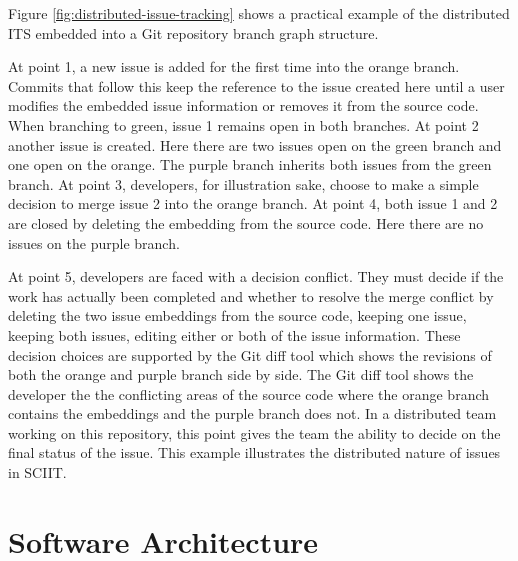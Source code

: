 \documentclass{mproj}
\begin{document}
Figure \ref{fig:distributed-issue-tracking} shows a practical example of the distributed ITS embedded into a Git repository branch graph structure. 

At point 1, a new issue is added for the first time into the orange branch. Commits that follow this keep the reference to the issue created here until a user modifies the embedded issue information or removes it from the source code. When branching to green, issue 1 remains open in both branches. At point 2 another issue is created. Here there are two issues open on the green branch and one open on the orange. The purple branch inherits both issues from the green branch. At point 3, developers, for illustration sake, choose to make a simple decision to merge issue 2 into the orange branch. At point 4, both issue 1 and 2 are closed by deleting the embedding from the source code. Here there are no issues on the purple branch. 

At point 5, developers are faced with a decision conflict. They must decide if the work has actually been completed and whether to resolve the merge conflict by deleting the two issue embeddings from the source code, keeping one issue, keeping both issues, editing either or both of the issue information. These decision choices are supported by the Git diff tool which shows the revisions of both the orange and purple branch side by side. The Git diff tool shows the developer the the conflicting areas of the source code where the orange branch contains the embeddings and the purple branch does not. In a distributed team working on this repository, this point gives the team the ability to decide on the final status of the issue. This example illustrates the distributed nature of issues in SCIIT.


\section{Software Architecture}
\end{document}

